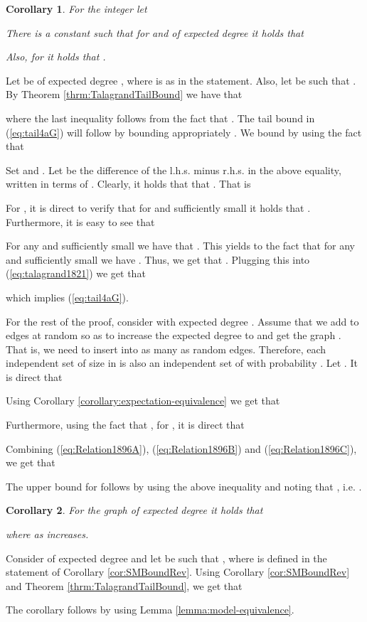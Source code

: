 \documentclass[a4paper,10pt]{article}
\makeatletter
\newtheorem{corollary}{Corollary}\renewcommand{\thecorollary}{\arabic{corollary}}
\newenvironment{proof}{\noindent{\bf Proof\@:}}{\hfill \\}
\makeatother
\begin{document}
\begin{corollary}\label{theorem:Reverse-Frieze}
For the integer  let
	
There is a constant  such that for  and 
of expected degree  it holds that

Also, for  it holds that
.
\end{corollary}
\begin{proof}
Let  be of expected degree ,
where  is as in the statement. Also, let  be such that
. By Theorem \ref{thrm:TalagrandTailBound}
we have that

where the last inequality follows from the fact that . The
tail bound in (\ref{eq:tail4aG}) will follow by bounding appropriately
. We bound  by using the fact that

Set  and . Let  be the difference of the l.h.s.
minus r.h.s. in the above equality, written in terms of .
Clearly, it holds that that . That is

For , it is direct to verify that for 
 and sufficiently small  
it holds that . Furthermore, it is easy to see that

For any  and sufficiently small  we have that
. This yields to the fact
that for any  and sufficiently small
 we have . Thus, we get that .
Plugging this  into (\ref{eq:talagrand1821}) we get that

which implies (\ref{eq:tail4aG}).

For the rest of the proof, consider  with expected degree
.  Assume that we add to  edges at random so
as to increase the expected degree to  
and get the graph .
That is, we need to insert into  as many as 
random edges. Therefore, each independent set of size  in
 is also an independent set of  with probability
. Let . It is direct
that 

Using Corollary \ref{corollary:expectation-equivalence} we get that

Furthermore, using the fact that ,
for , it is direct that

Combining (\ref{eq:Relation1896A}), (\ref{eq:Relation1896B}) and
(\ref{eq:Relation1896C}), we get that 

The upper bound for  follows by using the
above inequality and noting that , i.e.
.
\end{proof}



\begin{corollary}\label{cor:ExistenceGnm}
For the graph  of expected degree  it holds that

where  as  increases.
\end{corollary}
\begin{proof}
Consider  of expected degree  and let  be such that
, 
where  is defined in the statement of Corollary \ref{cor:SMBoundRev}. 
Using Corollary \ref{cor:SMBoundRev} and Theorem \ref{thrm:TalagrandTailBound}, 
we get that

The corollary follows by using Lemma \ref{lemma:model-equivalence}.
\end{proof}
\end{document}

